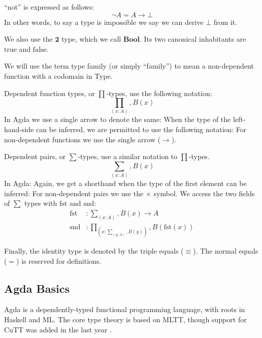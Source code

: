 \begin{refsection}
\begin{subappendices}
``not'' is expressed as follows:
\begin{equation}
  \neg A = A \rightarrow \bot
\end{equation}
In other words, to say a type is impossible we say we can derive \(\bot\) from
it.

We also use the \(\mathbf{2}\) type, which we call \(\textbf{Bool}\).
Its two canonical inhabitants are \(\text{true}\) and \(\text{false}\).

We will use the term type family (or simply ``family'') to mean a non-dependent
function with a codomain in Type.





Dependent function types, or \(\prod\)-types, use the following notation:
\begin{equation}
  \prod_{(x : A)} , B (x)
\end{equation}
In Agda we use a single arrow to denote the same:
When the type of the left-hand-side can be inferred, we are permitted to use the
following notation:
For non-dependent functions we use the single arrow (\(\rightarrow\)).

Dependent pairs, or \(\sum\)-types, use a similar notation to \(\prod\)-types.
\begin{equation}
  \sum_{(x : A)} , B (x)
\end{equation}
In Agda:
Again, we get a shorthand when the type of the first element can be inferred:
For non-dependent pairs we use the \(\times\) symbol.
We access the two fields of \(\sum\) types with \(\text{fst}\) and
\(\text{snd}\):
\begin{align}
  \text{fst} &: \sum_{(x : A)} , B (x) \rightarrow A \\
  \text{snd} &: \prod_{(x : \sum_{(y : A)} , B (y))} , B (\text{fst}(x))
\end{align}

Finally, the identity type is denoted by the triple equals (\(\equiv\)).
The normal equals (\(=\)) is reserved for definitions.


\subsection{Agda Basics}
Agda \cite{norellDependentlyTypedProgramming2008} is a dependently-typed
functional programming language, with roots in Haskell and ML.
The core type theory is based on MLTT, though support for CuTT was added in the
last year \cite{vezzosiCubicalAgdaDependently2019}.

\end{subappendices}
\end{refsection}
